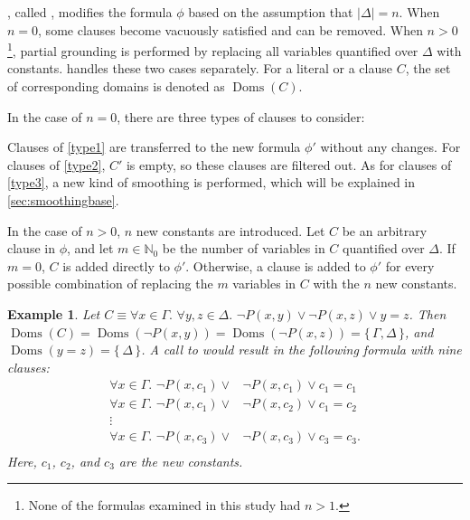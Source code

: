 \documentclass{article}
\newtheorem{example}{Example}
\theoremstyle{remark}
\DeclareMathOperator{\Doms}{Doms}
\begin{document}
, called \Propagate, modifies the formula $\phi$ based on
the assumption that $|\Delta| = n$. When $n=0$, some clauses become vacuously
satisfied and can be removed. When $n > 0$\footnote{None of the formulas
  examined in this study had $n > 1$.}, partial grounding is performed by
replacing all variables quantified over $\Delta$ with constants.
 handles these two cases separately. For a literal or a
clause $C$, the set of corresponding domains is denoted as $\Doms(C)$.

In the case of $n = 0$, there are three types of clauses to consider:
Clauses of \cref{type1} are transferred to the new formula $\phi'$ without any
changes. For clauses of \cref{type2}, $C'$ is empty, so these clauses are
filtered out. As for clauses of \cref{type3}, a new kind of smoothing is
performed, which will be explained in \cref{sec:smoothingbase}.

In the case of $n>0$, $n$ new constants are introduced. Let $C$ be an arbitrary
clause in $\phi$, and let $m \in \mathbb{N}_{0}$ be the number of variables in
$C$ quantified over $\Delta$. If $m=0$, $C$ is added directly to $\phi'$.
Otherwise, a clause is added to $\phi'$ for every possible combination of
replacing the $m$ variables in $C$ with the $n$ new constants.

\begin{example}
  Let $C \equiv \forall x \in \Gamma\text{. }\forall y, z \in \Delta\text{.
  } \neg P(x, y) \lor \neg P(x, z) \lor y=z$. Then
  $\Doms(C) = \Doms(\neg P(x, y)) = \Doms(\neg P(x, z)) = \{\, \Gamma, \Delta \,\}$,
  and $\Doms(y=z) = \{\, \Delta \,\}$. A call to  would result in the following formula with nine clauses:
  \begin{align*}
    \forall x \in \Gamma\text{. }\neg P(x, c_{1}) \lor& \neg P(x, c_{1}) \lor c_{1}=c_{1}\\
    \forall x \in \Gamma\text{. }\neg P(x, c_{1}) \lor& \neg P(x, c_{2}) \lor c_{1}=c_{2}\\
    \vdots&\\
    \forall x \in \Gamma\text{. }\neg P(x, c_{3}) \lor& \neg P(x, c_{3}) \lor c_{3}=c_{3}.\\
  \end{align*}
  Here, $c_{1}$, $c_{2}$, and $c_{3}$ are the new constants.
\end{example}
\end{document}

